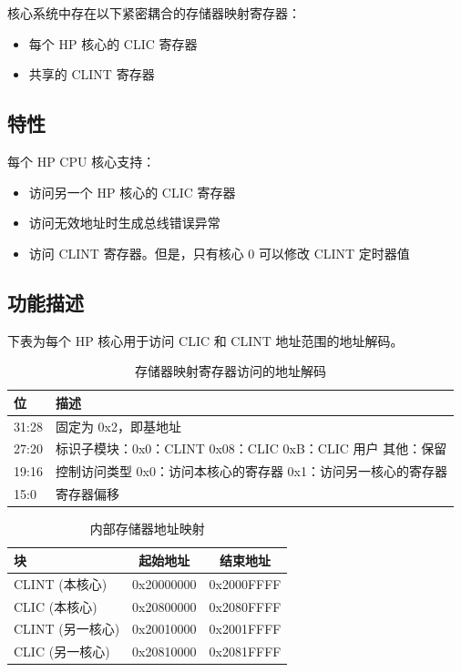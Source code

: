 \documentclass[main\_\_CN.tex]{subfiles}
\begin{document}
核心系统中存在以下紧密耦合的存储器映射寄存器：

\begin{itemize}
    \item 每个 HP 核心的 CLIC 寄存器
    \item 共享的 CLINT 寄存器
\end{itemize}

\subsection{特性}
\label{sec:riscvcpu-tcip-features}

每个 HP CPU 核心支持：
\begin{itemize}
    \item 访问另一个 HP 核心的 CLIC 寄存器
    \item 访问无效地址时生成总线错误异常
    \item 访问 CLINT 寄存器。但是，只有核心 0 可以修改 CLINT 定时器值
\end{itemize}

\subsection{功能描述}
\label{sec:riscvcpu-tcip-func-descr}

下表为每个 HP 核心用于访问 CLIC 和 CLINT 地址范围的地址解码。

\begin{longtable}{ | l | p{5 cm} | }
\caption{存储器映射寄存器访问的地址解码} \label{tab:riscvcpu-tcip-table}
\\ \hline
\rowcolor{lightgray}
位 & 描述 \\ \hline
31:28 & 固定为 0x2，即基地址 \\ \hline
27:20 & 标识子模块：\newline 0x0：CLINT \newline 0x08：CLIC \newline 0xB：CLIC 用户 \newline 其他：保留 \\ \hline
19:16 & 控制访问类型 \newline 0x0：访问本核心的寄存器 \newline 0x1：访问另一核心的寄存器\\ \hline
15:0 & 寄存器偏移 \\ \hline
\end{longtable}


\begin{longtable}{ | l | c | c |}
\caption{内部存储器地址映射} \label{tab:riscvcpu-tcip-slave-table}
\\ \hline
\rowcolor{lightgray}
块 & 起始地址 & 结束地址 \\ \hline
CLINT (本核心) & 0x20000000  &  0x2000FFFF\\ \hline
CLIC (本核心) & 0x20800000  &  0x2080FFFF\\ \hline
CLINT (另一核心) & 0x20010000  &  0x2001FFFF\\ \hline
CLIC (另一核心) & 0x20810000  &  0x2081FFFF\\ \hline
\end{longtable}
\end{document}
